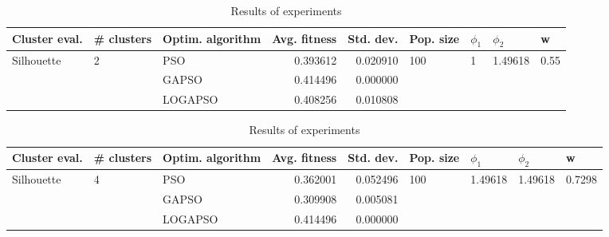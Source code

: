 \documentclass{article}
\begin{document}
\begin{table}
\centering
\caption{Results of experiments}
\begin{tabular}{lllrrllll}
\toprule
              Cluster eval. &        \# clusters & Optim. algorithm &  Avg. fitness &  Std. dev. &            Pop. size &         $\phi_{1}$ &               $\phi_{2}$ &                     w \\
\midrule
\multirow{3}{*}{Silhouette} & \multirow{3}{*}{2} &              PSO &      0.393612 &   0.020910 & \multirow{3}{*}{100} & \multirow{3}{*}{1} & \multirow{3}{*}{1.49618} & \multirow{3}{*}{0.55} \\
                            &                    &            GAPSO &      0.414496 &   0.000000 &                      &                    &                          &                       \\
                            &                    &          LOGAPSO &      0.408256 &   0.010808 &                      &                    &                          &                       \\
\bottomrule
\end{tabular}
\end{table}
\begin{table}
\centering
\caption{Results of experiments}
\begin{tabular}{lllrrllll}
\toprule
              Cluster eval. &        \# clusters & Optim. algorithm &  Avg. fitness &  Std. dev. &            Pop. size &               $\phi_{1}$ &               $\phi_{2}$ &                       w \\
\midrule
\multirow{3}{*}{Silhouette} & \multirow{3}{*}{4} &              PSO &      0.362001 &   0.052496 & \multirow{3}{*}{100} & \multirow{3}{*}{1.49618} & \multirow{3}{*}{1.49618} & \multirow{3}{*}{0.7298} \\
                            &                    &            GAPSO &      0.309908 &   0.005081 &                      &                          &                          &                         \\
                            &                    &          LOGAPSO &      0.414496 &   0.000000 &                      &                          &                          &                         \\
\bottomrule
\end{tabular}
\end{table}
\end{document}
